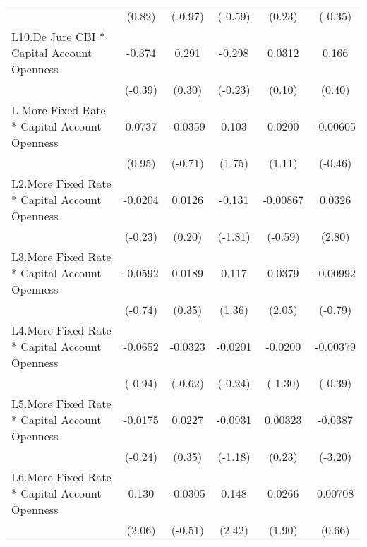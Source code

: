 {\begin{longtable}{l*{5}{c}}
                &   (0.82)         &  (-0.97)         &  (-0.59)         &   (0.23)         &  (-0.35)         \\
\addlinespace
L10.De Jure CBI * Capital Account Openness&   -0.374         &    0.291         &   -0.298         &   0.0312         &    0.166         \\
                &  (-0.39)         &   (0.30)         &  (-0.23)         &   (0.10)         &   (0.40)         \\
\addlinespace
L.More Fixed Rate * Capital Account Openness&   0.0737         &  -0.0359         &    0.103         &   0.0200         & -0.00605         \\
                &   (0.95)         &  (-0.71)         &   (1.75)         &   (1.11)         &  (-0.46)         \\
\addlinespace
L2.More Fixed Rate * Capital Account Openness&  -0.0204         &   0.0126         &   -0.131         & -0.00867         &   0.0326\sym{**} \\
                &  (-0.23)         &   (0.20)         &  (-1.81)         &  (-0.59)         &   (2.80)         \\
\addlinespace
L3.More Fixed Rate * Capital Account Openness&  -0.0592         &   0.0189         &    0.117         &   0.0379\sym{*}  & -0.00992         \\
                &  (-0.74)         &   (0.35)         &   (1.36)         &   (2.05)         &  (-0.79)         \\
\addlinespace
L4.More Fixed Rate * Capital Account Openness&  -0.0652         &  -0.0323         &  -0.0201         &  -0.0200         & -0.00379         \\
                &  (-0.94)         &  (-0.62)         &  (-0.24)         &  (-1.30)         &  (-0.39)         \\
\addlinespace
L5.More Fixed Rate * Capital Account Openness&  -0.0175         &   0.0227         &  -0.0931         &  0.00323         &  -0.0387\sym{**} \\
                &  (-0.24)         &   (0.35)         &  (-1.18)         &   (0.23)         &  (-3.20)         \\
\addlinespace
L6.More Fixed Rate * Capital Account Openness&    0.130\sym{*}  &  -0.0305         &    0.148\sym{*}  &   0.0266         &  0.00708         \\
                &   (2.06)         &  (-0.51)         &   (2.42)         &   (1.90)         &   (0.66)         \\

\end{longtable}}
